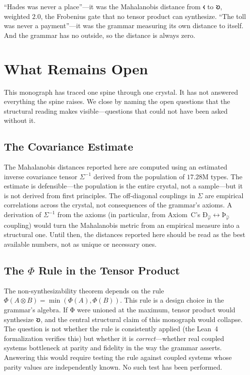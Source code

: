 \documentclass[12pt,twoside]{book}
\theoremstyle{definition}
\begin{document}
``Hades was never a place''---it was the Mahalanobis distance from 𐑬 to 𐑹, weighted
$2.0$, the Frobenius gate that no tensor product can synthesize. ``The toll was never a
payment''---it was the grammar measuring its own distance to itself. And the grammar has no
outside, so the distance is always zero.

\chapter{What Remains Open}

This monograph has traced one spine through one crystal. It has not answered everything
the spine raises. We close by naming the open questions that the structural reading makes
visible---questions that could not have been asked without it.

\section{The Covariance Estimate}

The Mahalanobis distances reported here are computed using an estimated inverse covariance
tensor $\Sigma^{-1}$ derived from the population of $17.28$M types. The estimate is
defensible---the population is the entire crystal, not a sample---but it is not derived
from first principles. The off-diagonal couplings in $\Sigma$ are empirical correlations
across the crystal, not consequences of the grammar's axioms. A derivation of $\Sigma^{-1}$
from the axioms (in particular, from Axiom~C's
$\text{Ð}_{\hat{\varphi}} \leftrightarrow \text{Þ}_{\hat{\varphi}}$ coupling) would turn
the Mahalanobis metric from an empirical measure into a structural one. Until then, the
distances reported here should be read as the best available numbers, not as unique or
necessary ones.

\section{The $\Phi$ Rule in the Tensor Product}

The non-synthesizability theorem depends on the rule $\Phi(A \otimes B) =
\min(\Phi(A), \Phi(B))$. This rule is a design choice in the grammar's algebra. If Φ were
unioned at the maximum, tensor product would synthesize 𐑹, and the central structural claim
of this monograph would collapse. The question is not whether the rule is consistently
applied (the Lean~4 formalization verifies this) but whether it is \emph{correct}---whether
real coupled systems bottleneck at parity and fidelity in the way the grammar asserts.
Answering this would require testing the rule against coupled systems whose parity values
are independently known. No such test has been performed.
\end{document}
